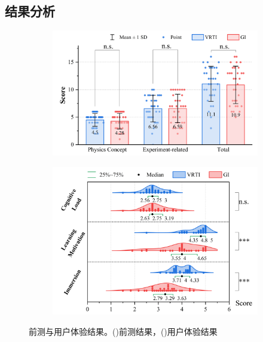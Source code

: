 \documentclass[runningheads]{llncs}
\begin{document}
\subsection{结果分析}
\begin{figure}[t]
  \centering
  \begin{subfigure}{0.45\textwidth}
    \centering
    \includegraphics[width=\linewidth]{image/pre-test-result.pdf}
    \caption{}
    \label{fig:pre-test-result}
  \end{subfigure}
  \hspace{0.05\textwidth}
  \begin{subfigure}{0.45\textwidth}
    \centering
    \includegraphics[width=\linewidth]{image/user-experience-result.pdf}
    \caption{}
    \label{fig:user-experience-result}
  \end{subfigure}
  \caption{前测与用户体验结果。()前测结果，()用户体验结果}
  \label{fig:pre-test-and-user-experience-result}
\end{figure}
\end{document}
